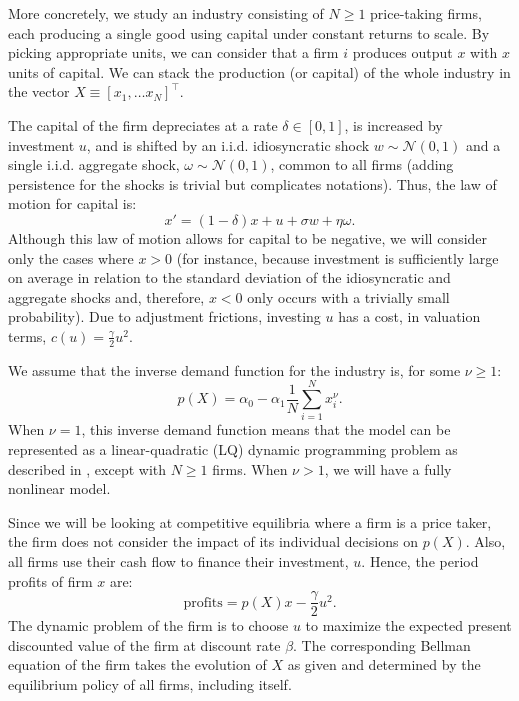 \documentclass[12pt]{article}
\begin{document}
More concretely, we study an industry consisting of $N \geq 1$ price-taking firms, each producing a single good using capital under constant returns to scale. By picking appropriate units, we can consider that a firm $i$ produces output $x$ with $x$ units of capital. We can stack the production (or capital) of the whole industry in the vector $X \equiv [x_1, \ldots x_N]^\top$.

The capital of the firm depreciates at a rate $\delta\in [0,1]$, is increased by investment $u$, and is shifted by an i.i.d. idiosyncratic shock $w \sim \mathcal{N}(0,1)$ and a single i.i.d. aggregate shock, $\omega \sim \mathcal{N}(0,1)$, common to all firms (adding persistence for the shocks is trivial but complicates notations). Thus, the law of motion for capital is: 
\begin{equation*}
x' = (1-\delta)x + u + \sigma w + \eta \omega.
\end{equation*}
Although this law of motion allows for capital to be negative, we will consider only the cases where $x>0$ (for instance, because investment is sufficiently large on average in relation to the standard deviation of the idiosyncratic and aggregate shocks and, therefore, $x<0$ only occurs with a trivially small probability). Due to adjustment frictions, investing $u$ has a cost, in valuation terms, $c(u) = \frac{\gamma}{2}u^2$.

We assume that the inverse demand function for the industry is, for some $\nu \geq 1$:
\begin{equation}
p(X) = \alpha_0 - \alpha_1 \frac{1}{N}\sum_{i=1}^N x_i^{\nu}.
\label{eq:p-nonlinear-PI}
\end{equation}
When $\nu = 1$, this inverse demand function means that the model can be represented as a linear-quadratic (LQ) dynamic programming problem as described in \citet[Section 7.2]{LjungqvistSargent2018}, except with $N \geq 1$ firms. When $\nu > 1$, we will have a fully nonlinear model.
	
Since we will be looking at competitive equilibria where a firm is a price taker, the firm does not consider the impact of its individual decisions on $p(X)$. Also, all firms use their cash flow to finance their investment, $u$. Hence, the period profits of firm $x$ are:
\begin{equation*}
\text{profits} = p(X)x-\frac{\gamma}{2}u^2.
\end{equation*}
The dynamic problem of the firm is to choose $u$ to maximize the expected present discounted value of the firm at discount rate $\beta$. The corresponding Bellman equation of the firm takes the evolution of $X$ as given and determined by the equilibrium policy of all firms, including itself. 
\end{document}
